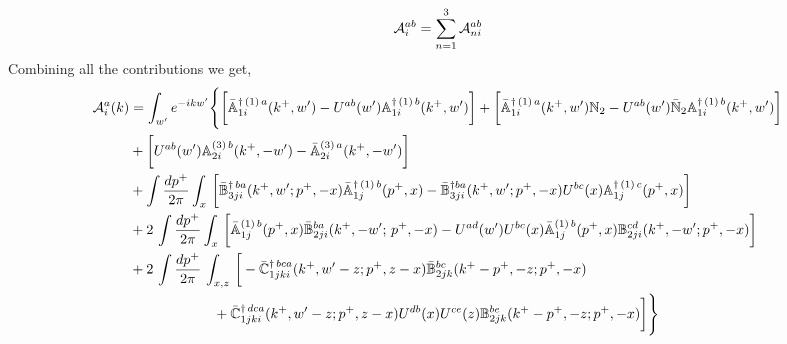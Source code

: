\documentclass[aps,prd,amsmath,amssymb,nofootinbib]{revtex4-2}
\def\mf#1{\mathbb{#1}}
\numberwithin{equation}{section}
\begin{document}
\begin{align}
    {\cal A}^{ab}_i = \sum_{n=1}^3 {\cal A}^{ab}_{n i} 
\end{align}
Combining all the contributions we get,
    \begin{align}
         {\cal A}^{a}_{i}(k) & = \int_{w^{\prime}}e^{-ikw^{\prime}} \Bigg\{\bigg[\bar{\mf{A}}^{\dagger\,(1)\,a}_{1i}(k^{+},w^{\prime})-U^{ab}(w^{\prime})\mf{A}^{\dagger\, (1)\, b}_{1i}(k^{+},
         w^{\prime})\bigg]+\bigg[\bar{\mf{A}}^{\dagger\,(1)\,a}_{1i}(k^{+},w^{\prime})\mf{N}_{2} -U^{ab}(w^{\prime})\bar{\mf{N}}_{2}\mf{A}^{\dagger\, (1)\, b}_{1i}(k^{+},w^{\prime})\bigg]\notag 
         \\ & +\bigg[U^{ab}(w^{\prime})\mf{A}^{(3)\, b}_{2i}(k^{+},- w^{\prime})-\Bar{\mf{A}}^{(3)\, a}_{2i}(k^{+}, - w^{\prime})\bigg]\notag 
         \\ & 
         +\int \frac{dp^{+}}{2\pi}\int_{x}\,\bigg[\Bar{\mf{B}}^{\dagger\, ba}_{3ji}(k^{+}, w^{\prime}; p^{+}, -x)\Bar{\mf{A}}^{\dagger\, (1)\,b}_{1j}(p^{+}, x)
         -\Bar{\mf{B}}^{\dagger ba}_{3ji}(k^{+},w^{\prime}; p^{+},-x) U^{bc}(x) \mf{A}^{\dagger\,(1)\, c}_{1j}(p^{+},x)\bigg]\notag
         \\ & 
         +2\,\int \frac{dp^{+}}{2\pi}\int_{x}\,\bigg[ \Bar{\mf{A}}^{(1)\, b}_{1j}(p^{+}, x)\Bar{\mf{B}}^{ba}_{2ji}(k^{+},-w^{\prime};\,p^{+}, -x) -U^{ad}(w^\prime)U^{bc}(x) \bar{\mf{A}}^{(1)\, b}_{1j}(p^+,x) {\mf{B}}^{cd}_{2ji} (k^+, -w^\prime;p^+, -x)\bigg]\notag 
         \\ & 
         +2\, \int \frac{dp^{+}}{2\pi}\,\int_{x,z}\, \bigg[-\Bar{\mf{C}}^{\dagger\, bca}_{1jki}(k^{+},w^{\prime}-z;p^{+},z-x)\Bar{\mf{B}}^{bc}_{2jk}(k^{+}-p^{+},- z;p^{+},-x)
         \notag \\ & \qquad \qquad \qquad  +\bar{\mf{C}}^{\dagger\, dca}_{1jki}(k^+,w^\prime-z; p^+, z-x)  
                 U^{db}(x)
                 U^{ce}(z) 
                {\mf{B}}^{be}_{2jk} (k^{+}-p^+, -z; p^+, -x) \bigg] \Bigg\}
   \end{align}   
\end{document}
